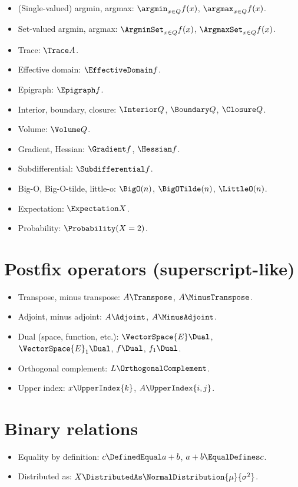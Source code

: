 \documentclass{article}
\begin{document}
  \begin{itemize}
    \item (Single-valued) argmin, argmax: $\argmin_{x \in Q} f(x)$, $\argmax_{x \in Q} f(x)$.
    \item Set-valued argmin, argmax: $\ArgminSet_{x \in Q} f(x)$, $\ArgmaxSet_{x \in Q} f(x)$.
    \item Trace: $\Trace A$.
    \item Effective domain: $\EffectiveDomain f$.
    \item Epigraph: $\Epigraph f$.
    \item Interior, boundary, closure: $\Interior Q$, $\Boundary Q$, $\Closure Q$.
    \item Volume: $\Volume Q$.
    \item Gradient, Hessian: $\Gradient f$, $\Hessian f$.
    \item Subdifferential: $\Subdifferential f$.
    \item Big-O, Big-O-tilde, little-o: $\BigO(n)$, $\BigOTilde(n)$, $\LittleO(n)$.
    \item Expectation: $\Expectation X$.
    \item Probability: $\Probability(X = 2)$.
  \end{itemize}

  \section{Postfix operators (superscript-like)}

  \begin{itemize}
    \item Transpose, minus transpose: $A\Transpose$, $A\MinusTranspose$.
    \item Adjoint, minus adjoint: $A\Adjoint$, $A\MinusAdjoint$.
    \item Dual (space, function, etc.): $\VectorSpace{E}\Dual$, $\VectorSpace{E}_1\Dual$, $f\Dual$, $f_1\Dual$.
    \item Orthogonal complement: $L\OrthogonalComplement$.
    \item Upper index: $x\UpperIndex{k}$, $A\UpperIndex{i, j}$.
  \end{itemize}

  \section{Binary relations}

  \begin{itemize}
    \item Equality by definition: $c \DefinedEqual a + b$, $a + b \EqualDefines c$.
    \item Distributed as: $X \DistributedAs \NormalDistribution{\mu}{\sigma^2}$.
  \end{itemize}
\end{document}
